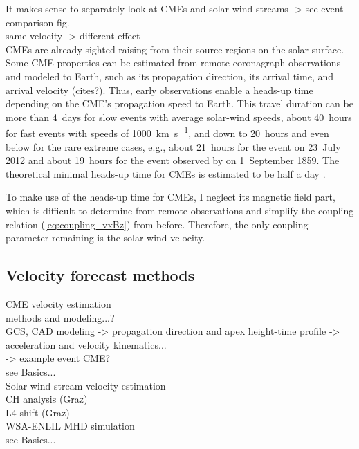 It makes sense to separately look at CMEs and solar-wind streams -> see event comparison fig.\\
same velocity -> different \Kp{} effect\\

CMEs are already sighted raising from their source regions on the solar surface. Some CME properties can be estimated from remote coronagraph observations and modeled to Earth, such as its propagation direction, its arrival time, and arrival velocity (cites?). Thus, early observations enable a heads-up time depending on the CME's propagation speed to Earth. This travel duration can be more than 4~days for slow events with average solar-wind speeds, about 40~hours for fast events with speeds of \SI{1000}{\km\per\s}, and down to 20~hours and even below for the rare extreme cases, e.g., about 21~hours for the event on 23~July 2012 \citep{Russell2013,Temmer2015} and about 19~hours for the event observed by \citet{Carrington1859} on 1~September 1859. The theoretical minimal heads-up time for CMEs is estimated to be half a day \citep{Gopalswamy2005}.

To make use of the heads-up time for CMEs, I neglect its magnetic field part, which is difficult to determine from remote observations and simplify the coupling relation (\ref{eq:coupling_vxBz}) from before. Therefore, the only coupling parameter remaining is the solar-wind velocity.

\subsection{Velocity forecast methods}

CME velocity estimation\\
methods and modeling...?\\
GCS, CAD modeling -> propagation direction and apex height-time profile -> acceleration and velocity kinematics...\\
-> example event CME?\\
see Basics...\\

Solar wind stream velocity estimation\\
CH analysis (Graz)\\
L4 shift (Graz)\\
WSA-ENLIL MHD simulation\\
see Basics...\\


